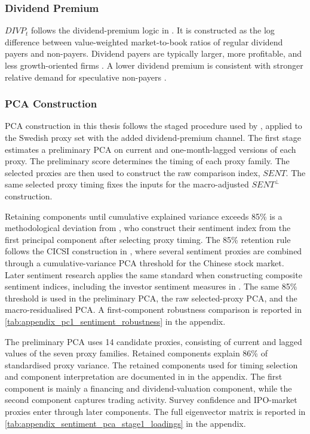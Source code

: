 \documentclass[11pt]{article}
\newcommand{\var}[1]{\ensuremath{#1}}
\begin{document}
\subsubsection{Dividend Premium}
\var{DIVP_t} follows the dividend-premium logic in \citet{baker2006sentiment}. It is constructed as the log difference between value-weighted market-to-book ratios of regular dividend payers and non-payers. Dividend payers are typically larger, more profitable, and less growth-oriented firms \citep{fama2001disappearing}. A lower dividend premium is consistent with stronger relative demand for speculative non-payers \citep{baker2004catering,baker2006sentiment}.

\subsubsection{PCA Construction}
PCA construction in this thesis follows the staged procedure used by \citet{zhang2023sweden}, applied to the Swedish proxy set with the added dividend-premium channel. The first stage estimates a preliminary PCA on current and one-month-lagged versions of each proxy. The preliminary score determines the timing of each proxy family. The selected proxies are then used to construct the raw comparison index, \var{SENT}. The same selected proxy timing fixes the inputs for the macro-adjusted \var{SENT^{\perp}} construction.

Retaining components until cumulative explained variance exceeds 85\% is a methodological deviation from \citet{baker2006sentiment}, who construct their sentiment index from the first principal component after selecting proxy timing. The 85\% retention rule follows the CICSI construction in \citet{yi2009cicsi}, where several sentiment proxies are combined through a cumulative-variance PCA threshold for the Chinese stock market. Later sentiment research applies the same standard when constructing composite sentiment indices, including the investor sentiment measures in \citet{guo2026epu}. The same 85\% threshold is used in the preliminary PCA, the raw selected-proxy PCA, and the macro-residualised PCA. A first-component robustness comparison is reported in \cref{tab:appendix_pc1_sentiment_robustness} in the appendix.

The preliminary PCA uses 14 candidate proxies, consisting of current and lagged values of the seven proxy families. Retained components explain 86\% of standardised proxy variance. The retained components used for timing selection and component interpretation are documented in  in the appendix. The first component is mainly a financing and dividend-valuation component, while the second component captures trading activity. Survey confidence and IPO-market proxies enter through later components. The full eigenvector matrix is reported in \cref{tab:appendix_sentiment_pca_stage1_loadings} in the appendix.
\end{document}
